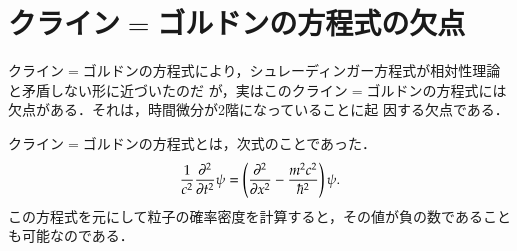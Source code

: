    \section{クライン$=$ゴルドンの方程式の欠点}
        クライン$=$ゴルドンの方程式により，シュレーディンガー方程式が相対性理論と矛盾しない形に近づいたのだ
        が，実はこのクライン$=$ゴルドンの方程式には欠点がある．それは，時間微分が2階になっていることに起
        因する欠点である．

        クライン$=$ゴルドンの方程式とは，次式のことであった．
            \begin{equation*}
                \frac{1}{c^{2}}\frac{\partial^{2}}{\partial t^{2}} \psi
                    = \left(
                        \frac{\partial^{2}}{\partial x^{2}} - \frac{m^{2}c^{2}}{\hbar^{2}}
                      \right) \psi.
            \end{equation*}
        この方程式を元にして粒子の確率密度を計算すると，その値が負の数であることも可能なのである．

